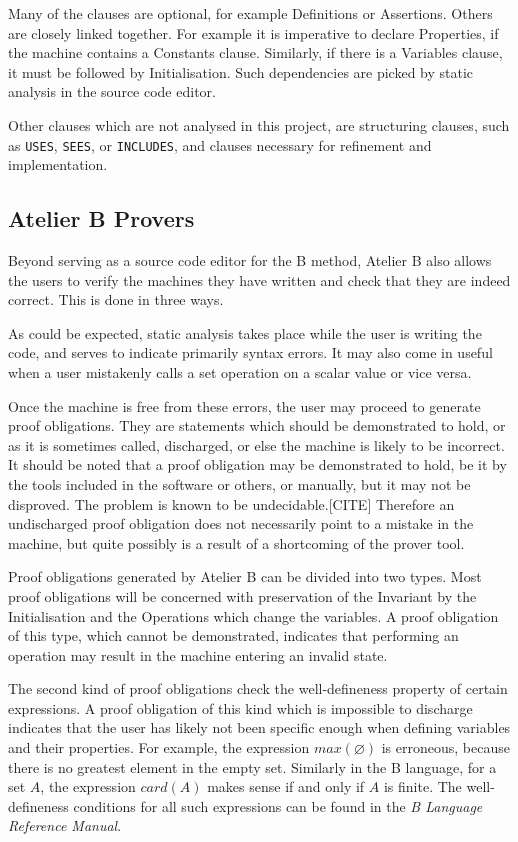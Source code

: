 \documentclass[11pt,journal]{IEEEtran}
\begin{document}
	Many of the clauses are optional, for example Definitions or Assertions. Others are closely linked together. For example it is imperative to declare Properties, if the machine contains a Constants clause. Similarly, if there is a Variables clause, it must be followed by Initialisation. Such dependencies are picked by static analysis in the source code editor.
	
	Other clauses which are not analysed in this project, are structuring clauses, such as \texttt{USES}, \texttt{SEES}, or \texttt{INCLUDES}, and clauses necessary for refinement and implementation.
	
	\subsection{Atelier B Provers}
	Beyond serving as a source code editor for the B method, Atelier B also allows the users to verify the machines they have written and check that they are indeed correct. This is done in three ways. 
	
	As could be expected, static analysis takes place while the user is writing the code, and serves to indicate primarily syntax errors. It may also come in useful when a user mistakenly calls a set operation on a scalar value or vice versa.  
	
	Once the machine is free from these errors, the user may proceed to generate proof obligations. They are statements which should be demonstrated to hold, or as it is sometimes called, discharged, or else the machine is likely to be incorrect. It should be noted that a proof obligation may be demonstrated to hold, be it by the tools included in the software or others, or manually, but it may not be disproved. The problem is known to be undecidable.[CITE] Therefore an undischarged proof obligation does not necessarily point to a mistake in the machine, but quite possibly is a result of a shortcoming of the prover tool.
	
	Proof obligations generated by Atelier B can be divided into two types. Most proof obligations will be concerned with preservation of the Invariant by the Initialisation and the Operations which change the variables. A proof obligation of this type, which cannot be demonstrated, indicates that performing an operation may result in the machine entering an invalid state.
	
	The second kind of proof obligations check the well-defineness property of certain expressions. A proof obligation of this kind which is impossible to discharge indicates that the user has likely not been specific enough when defining variables and their properties. For example, the expression $max(\varnothing)$ is erroneous, because there is no greatest element in the empty set. Similarly in the B language, for a set $A$, the expression $card(A)$ makes sense if and only if $A$ is finite. The well-defineness conditions for all such expressions can be found in the \emph{B Language Reference Manual}\cite{b reference}.
	
\end{document}
